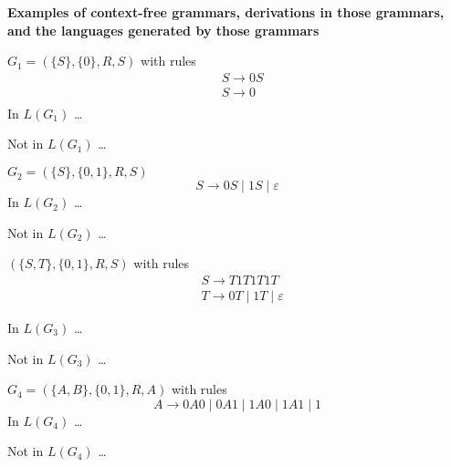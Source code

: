 \documentclass[12pt, oneside]{article}
\begin{document}
\vfill

\newpage
  
{\bf Examples of context-free grammars, derivations in those grammars, and the languages generated by those grammars}
  
$G_1 =  (\{S\}, \{0\}, R, S)$ with rules
  \begin{align*}
    &S \to 0S\\
    &S \to 0\\
  \end{align*}
  In  $L(G_1)$ \ldots 
  
\vfill

  Not in $L(G_1)$ \ldots 


  \vfill

\newpage
  $G_2 =  (\{S\}, \{0,1\}, R, S)$
  \[
  S \to 0S \mid 1S \mid \varepsilon
  \]
  In  $L(G_2)$ \ldots 
  
  \vspace{110pt}
  
  Not in $L(G_2)$ \ldots 

  \vspace{110pt}

  $(\{S, T\}, \{0, 1\}, R, S)$ with  rules
  \begin{align*}
  &S \to T1T1T1T \\
  &T \to  0T \mid 1T \mid \varepsilon
  \end{align*}

  In  $L(G_3)$ \ldots 
  
  \vspace{110pt}
  
  Not in $L(G_3)$ \ldots 

  \vspace{110pt}

\newpage
  $G_4 =  (\{A, B\}, \{0, 1\}, R, A)$ with rules
  \[
    A \to 0A0 \mid  0A1 \mid 1A0  \mid 1A1 \mid  1
  \]
  In  $L(G_4)$ \ldots 
  
  \vspace{110pt}
  
  Not in $L(G_4)$ \ldots 

  \vspace{110pt}
\end{document}
